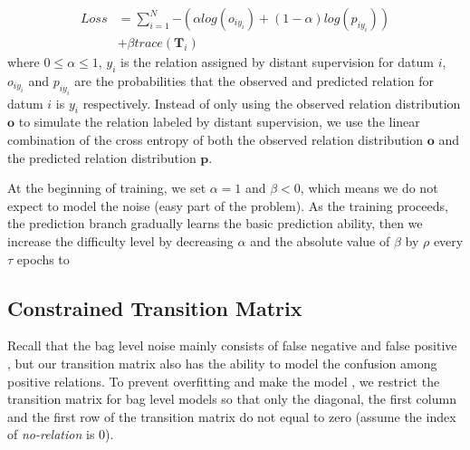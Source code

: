 \begin{equation}
\begin{aligned}
Loss	&=\sum_{i=1}^N{-(\alpha log(o_{iy_{i}}) + (1-\alpha) log(p_{iy_{i}}))} \\
&+ \beta trace(\mathbf{T}_{i})
\end{aligned}
\end{equation}
where $0\le\alpha\le1$, $y_i$ is the relation assigned by distant supervision for datum $i$, $o_{iy_{i}}$ and $p_{iy_{i}}$ are the probabilities that the observed and predicted relation for datum $i$ is $y_i$ respectively. Instead of only using the observed relation distribution $\mathbf{o}$ to simulate the relation labeled by distant supervision, we use the linear combination of the cross entropy of both the observed relation distribution $\mathbf{o}$ and the predicted relation distribution $\mathbf{p}$. 

At the beginning of training, we set $\alpha=1$ and $\beta<0$, which means we do not expect to model the noise (easy part of the problem). As the training proceeds, the prediction branch gradually learns the basic prediction ability,  then we increase the difficulty level by decreasing $\alpha$ and the absolute value of $\beta$ by $\rho$ every $\tau$ epochs to  

\subsection{Constrained Transition Matrix}
Recall that the bag level noise mainly consists of false negative and false positive , but our transition matrix also has the ability to model the confusion among positive relations. To prevent overfitting and make the model , we restrict the transition matrix for bag level models so that only the diagonal, the first column and the first row of the transition matrix do not equal to zero (assume the index of \emph{no-relation} is 0).  

